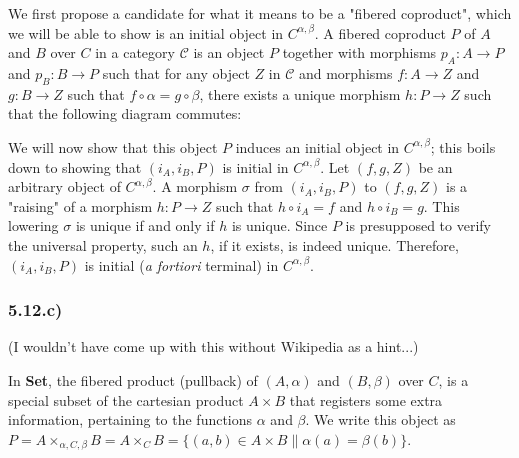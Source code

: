 \documentclass[12pt, letterpaper, twoside]{report}
\begin{document}
We first propose a candidate for what it means to be a "fibered coproduct", which we will be able to show is an initial object in $C^{\alpha,\beta}$. A fibered coproduct $P$ of $A$ and $B$ over $C$ in a category $\mathcal{C}$ is an object $P$ together with morphisms $p_A : A \to P$ and $p_B : B \to P$ such that for any object $Z$ in $\mathcal{C}$ and morphisms $f : A \to Z$ and $g : B \to Z$ such that $f \circ \alpha = g \circ \beta$, there exists a unique morphism $h : P \to Z$ such that the following diagram commutes:


We will now show that this object $P$ induces an initial object in $C^{\alpha,\beta}$; this boils down to showing that $(i_A, i_B, P)$ is initial in $C^{\alpha,\beta}$. Let $(f, g, Z)$ be an arbitrary object of $C^{\alpha,\beta}$. A morphism $\sigma$ from $(i_A, i_B, P)$ to $(f, g, Z)$ is a "raising" of a morphism $h : P \to Z$ such that $h \circ i_A = f$ and $h \circ i_B = g$. This lowering $\sigma$ is unique if and only if $h$ is unique. Since $P$ is presupposed to verify the universal property, such an $h$, if it exists, is indeed unique. Therefore, $(i_A, i_B, P)$ is initial (\textit{a fortiori} terminal) in $C^{\alpha,\beta}$.


\subsubsection*{5.12.c)}

(I wouldn't have come up with this without Wikipedia as a hint...)

In \textbf{Set}, the fibered product (pullback) of $(A, \alpha)$ and $(B, \beta)$ over $C$, is a special subset of the cartesian product $A \times B$ that registers some extra information, pertaining to the functions $\alpha$ and $\beta$. We write this object as $P = A \times_{\alpha, C, \beta} B = A \times_C B = \{ (a,b) \in A \times B \| \alpha(a) = \beta(b) \}$.
\end{document}
